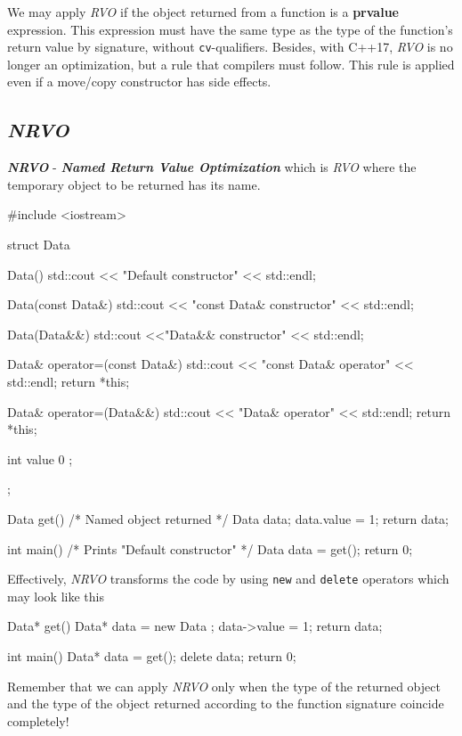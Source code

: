 \documentclass[../main]{subfiles}
\begin{document}
    We may apply \textit{RVO} if the object returned from a function is a \textbf{prvalue} expression. This expression must have the same type as the type of the function's return value by signature,
without \texttt{cv}-qualifiers. Besides, with C++17, \textit{RVO} is no longer an optimization, but a rule that compilers must follow. This rule is applied even if a move/copy constructor has side
effects.

\subsection{\textit{NRVO}}
    \textbf{\textit{NRVO}} - \textbf{\textit{Named Return Value Optimization}} which is \textit{RVO} where the temporary object to be returned has its name.
\begin{Code}
    #include <iostream>
    
    struct Data
    {
        Data()
        {
            std::cout << "Default constructor" << std::endl;
        }
        
        Data(const Data&)
        {
            std::cout << "const Data& constructor" << std::endl;
        }
        
        Data(Data&&)
        {
            std::cout <<"Data&& constructor" << std::endl;
        }
        
        Data& operator=(const Data&)
        {
            std::cout << "const Data& operator" << std::endl;
            return *this;
        }
        
        Data& operator=(Data&&)
        {
            std::cout << "Data& operator" << std::endl;
            return *this;
        }
        
        int value { 0 };
    };
    
    Data get()
    {
        /* Named object returned */
        Data data;
        data.value = 1;
        return data;
    }
    
    int main()
    {
        /* Prints "Default constructor" */
        Data data = get();
        return 0;
    }
\end{Code}
\noindent
Effectively, \textit{NRVO} transforms the code by using \texttt{new} and \texttt{delete} operators which may look like this
\begin{Code}
    Data* get()
    {
        Data* data = new Data {};
        data->value = 1;
        return data;
    }
    
    int main()
    {
        Data* data = get();
        delete data;
        return 0;
    }
\end{Code}
\noindent
Remember that we can apply \textit{NRVO} only when the type of the returned object and the type of the object returned according to the function signature
coincide completely!\newline
\end{document}
